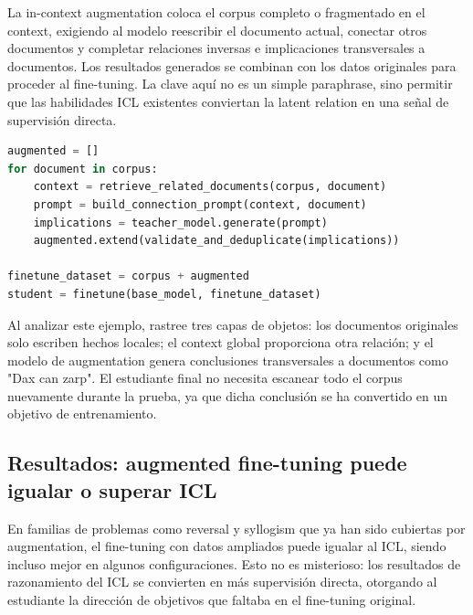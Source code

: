 La in-context augmentation coloca el corpus completo o fragmentado en el context, exigiendo al modelo reescribir el documento actual, conectar otros documentos y completar relaciones inversas e implicaciones transversales a documentos. Los resultados generados se combinan con los datos originales para proceder al fine-tuning. La clave aquí no es un simple paraphrase, sino permitir que las habilidades ICL existentes conviertan la latent relation en una señal de supervisión directa.


\begin{lstlisting}[language=Python,caption={Marco de implementación mínima para in-context augmentation}]
augmented = []
for document in corpus:
    context = retrieve_related_documents(corpus, document)
    prompt = build_connection_prompt(context, document)
    implications = teacher_model.generate(prompt)
    augmented.extend(validate_and_deduplicate(implications))

finetune_dataset = corpus + augmented
student = finetune(base_model, finetune_dataset)
\end{lstlisting}


Al analizar este ejemplo, rastree tres capas de objetos: los documentos originales solo escriben hechos locales; el context global proporciona otra relación; y el modelo de augmentation genera conclusiones transversales a documentos como "Dax can zarp". El estudiante final no necesita escanear todo el corpus nuevamente durante la prueba, ya que dicha conclusión se ha convertido en un objetivo de entrenamiento.

\subsection{Resultados: augmented fine-tuning puede igualar o superar ICL}

En familias de problemas como reversal y syllogism que ya han sido cubiertas por augmentation, el fine-tuning con datos ampliados puede igualar al ICL, siendo incluso mejor en algunos configuraciones. Esto no es misterioso: los resultados de razonamiento del ICL se convierten en más supervisión directa, otorgando al estudiante la dirección de objetivos que faltaba en el fine-tuning original.

